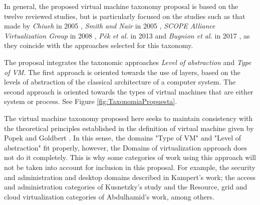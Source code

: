 	
	
	
	
	In general, the proposed virtual machine taxonomy proposal is based on the twelve reviewed studies, but is particularly focused on the studies such as that made by \textit{Chiueh} in 2005 \cite{Chiueh2005}, \textit{Smith and Nair} in 2005 \cite{Smith2005}, \textit{SCOPE Alliance Virtualization Group} in 2008 \cite{SCOPEAlliance2008}, \textit{P{\'e}k et al.} in 2013 \cite{Pek2013} and \textit{Bugnion et al.} in 2017 \cite{Bugnion2017}, as they coincide with the approaches selected for this taxonomy.
	
	The proposal integrates the taxonomic approaches \textit{Level of abstraction} and \textit{Type of VM}. The first approach is oriented towards the use of layers, based on the levels of abstraction of the classical architecture of a computer system. The second approach is oriented towards the types of virtual machines that are either system or process. See Figure \ref{fig:TaxonomiaPropuesta}. 
	
	
	
	The virtual machine taxonomy proposed here seeks to maintain consistency with the theoretical principles established in the definition of virtual machine given by Popek \cite{Popek1974} and Goldbert \cite{Popek1974, Popek1974}. In this sense, the domains "Type of VM" and "Level of abstraction" fit properly, however, the Domains of virtualization approach does not do it completely. This is why some categories of work using this approach will not be taken into account for inclusion in this proposal. For example, the security and administration and desktop domains described in Kampert's work; the access and administration categories of Kusnetzky's study and the Resource, grid and cloud virtualization categories of Abdulhamid's work, among others. 
	
